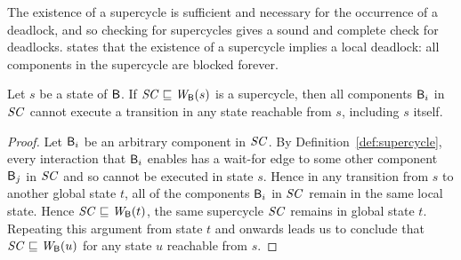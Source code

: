 The existence of a supercycle is sufficient and necessary for the occurrence of
a deadlock, and so checking for supercycles gives a sound and complete check for
deadlocks.  
%
 states that the
existence of a supercycle implies a local deadlock: all components in
the supercycle are blocked forever.

\begin{proposition}
\label{prop:static:supercycle-is-sufficient}
Let $s$ be a state of $\mathsf{B}$.
If $\mathit{SC} \sqsubseteq \mathit{W}_{\mathsf{B}}({s})$ is a supercycle, then all components $\mathsf{B}_i$ in $\mathit{SC}$ cannot execute a transition in any state reachable
from $s$, including $s$ itself.
\end{proposition}
%
\begin{proof}
Let $\mathsf{B}_i$ be an arbitrary component in $\mathit{SC}$. By Definition~\ref{def:supercycle}, every interaction that $\mathsf{B}_i$ enables
has a wait-for edge to some other component $\mathsf{B}_j$ in $\mathit{SC}$ and so cannot be executed in state $s$. Hence in any
transition from $s$ to another global state $t$, all of the components $\mathsf{B}_i$ in $\mathit{SC}$ remain in the same local state. 
Hence $\mathit{SC} \sqsubseteq \mathit{W}_{\mathsf{B}}({t})$, \ie the same supercycle $\mathit{SC}$ remains in global state $t$. Repeating this argument from state $t$
and onwards leads us to conclude that $\mathit{SC} \sqsubseteq \mathit{W}_{\mathsf{B}}({u})$ for any state $u$ reachable from $s$.
\end{proof}

